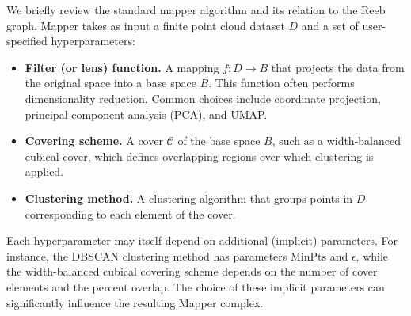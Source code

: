 We briefly review the standard mapper algorithm and its relation to the Reeb 
graph. Mapper takes as input a finite point cloud dataset $D$ and a set of 
user-specified hyperparameters:

\begin{itemize}
  \item \textbf{Filter (or lens) function.} 
  A mapping $f: D \to B$ that projects the data from the original space 
  into a base space $B$. This function often performs dimensionality reduction.
  Common choices include coordinate projection, principal component analysis (PCA),
  and UMAP.

  \item \textbf{Covering scheme.} 
  A cover $\mathcal{C}$ of the base space $B$, such as a width-balanced 
  cubical cover, which defines overlapping regions over which clustering is applied.

  \item \textbf{Clustering method.}
  A clustering algorithm that groups points in $D$ corresponding to each 
  element of the cover.
\end{itemize}

Each hyperparameter may itself depend on additional (implicit) parameters. 
For instance, the DBSCAN clustering method has parameters $\text{MinPts}$ and 
$\epsilon$, while the width-balanced cubical covering scheme depends on the 
number of cover elements and the percent overlap. The choice of these 
implicit parameters can significantly influence the resulting Mapper complex.

